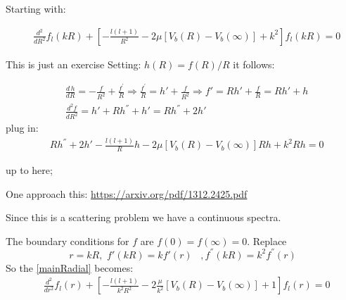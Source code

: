 \documentclass[11pt, oneside]{article}
\begin{document}
Starting with:

\begin{equation}\label{mainRadial}
\begin{split}
&\frac{d^2}{dR^2}f_l(kR)  +  \left[ - \frac{l(l+1)}{R^2} - 2\mu\left[V_b(R) - V_b(\infty)\right] + k^2\right]f_l(kR) = 0
\end{split}
\end{equation}

This is just an exercise
Setting:  $ h(R) = f(R)/R $ it follows:

\begin{equation}
\begin{split}
& \frac{d\,h}{dR} = -\frac{f}{R^2} + \frac{f^{'}}{R} \Rightarrow \frac{f^{'}}{R} = h' + \frac{f}{R^2} \Rightarrow f' = Rh' +  \frac{f}{R} = Rh' + h \\[.8em]
& \frac{d^2f}{dR^2} = h' + Rh^{''} + h' = Rh^{''} + 2h'
\end{split} 
\end{equation}
plug in:
\begin{equation}
\begin{split}
&  Rh^{''} + 2h' - \frac{l(l+1)}{R}h - 2\mu\left[V_b(R) - V_b(\infty)\right]Rh + k^2 Rh= 0
\end{split}
\end{equation}

up to here;

One approach this: \url{https://arxiv.org/pdf/1312.2425.pdf}

Since this is a scattering problem we have a continuous spectra. 

The boundary conditions for $ f $ are $ f(0) = f(\infty) = 0 $.  Replace 
\begin{equation}
r = kR, \,\,f'(kR) = k f'(r)\,\,\,\,\,,f^{''}(kR) = k^2 f^{''}(r)
\end{equation}
So the \eqref{mainRadial} becomes:
\begin{equation}\label{mainRadial}
\begin{split}
& \frac{d^2}{dr^2}f_l(r)  +  \left[ - \frac{l(l+1)}{k^2R^2} - 2\frac{\mu}{k^2}\left[V_b(R) - V_b(\infty)\right] + 1\right]f_l(r) = 0
\end{split}
\end{equation}
\end{document}
